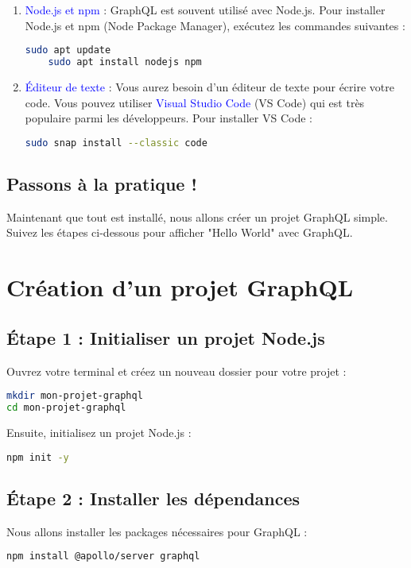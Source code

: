 \documentclass{article}
\begin{document}
\begin{enumerate}
    \item \textcolor{blue}{Node.js et npm} : GraphQL est souvent utilisé avec Node.js. Pour installer Node.js et npm (Node Package Manager), exécutez les commandes suivantes :
    \begin{lstlisting}[language=bash]
    sudo apt update
    sudo apt install nodejs npm
    \end{lstlisting}

    \item \textcolor{blue}{Éditeur de texte} : Vous aurez besoin d'un éditeur de texte pour écrire votre code. Vous pouvez utiliser \textcolor{blue}{Visual Studio Code} (VS Code) qui est très populaire parmi les développeurs. Pour installer VS Code :
    \begin{lstlisting}[language=bash]
    sudo snap install --classic code
    \end{lstlisting}
\end{enumerate}

\subsection{Passons à la pratique ! \faRocket}
Maintenant que tout est installé, nous allons créer un projet GraphQL simple. Suivez les étapes ci-dessous pour afficher "Hello World" avec GraphQL.

\section{Création d'un projet GraphQL}
\subsection{Étape 1 : Initialiser un projet Node.js}
Ouvrez votre terminal et créez un nouveau dossier pour votre projet :
\begin{lstlisting}[language=bash]
mkdir mon-projet-graphql
cd mon-projet-graphql
\end{lstlisting}

Ensuite, initialisez un projet Node.js :
\begin{lstlisting}[language=bash]
npm init -y
\end{lstlisting}

\subsection{Étape 2 : Installer les dépendances}
Nous allons installer les packages nécessaires pour GraphQL :
\begin{lstlisting}[language=bash]
npm install @apollo/server graphql
\end{lstlisting}
\end{document}
